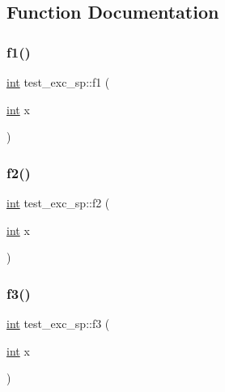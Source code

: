 \subsection{Function Documentation}
\mbox{\label{namespacetest__exc__sp_a6af51689c0be6ab0a45cfe1c9604340d}} 
\subsubsection{\texorpdfstring{f1()}{f1()}}
{\footnotesize\ttfamily \mbox{\hyperlink{warnings_8h_a74f207b5aa4ba51c3a2ad59b219a423b}{int}} test\+\_\+exc\+\_\+sp\+::f1 (\begin{DoxyParamCaption}\item[{\mbox{\hyperlink{warnings_8h_a74f207b5aa4ba51c3a2ad59b219a423b}{int}}}]{x }\end{DoxyParamCaption})\hspace{0.3cm}{\ttfamily [noexcept]}}

\mbox{\label{namespacetest__exc__sp_a9bbbfe12c645b1873720e3d8c8284435}} 
\subsubsection{\texorpdfstring{f2()}{f2()}}
{\footnotesize\ttfamily \mbox{\hyperlink{warnings_8h_a74f207b5aa4ba51c3a2ad59b219a423b}{int}} test\+\_\+exc\+\_\+sp\+::f2 (\begin{DoxyParamCaption}\item[{\mbox{\hyperlink{warnings_8h_a74f207b5aa4ba51c3a2ad59b219a423b}{int}}}]{x }\end{DoxyParamCaption})\hspace{0.3cm}{\ttfamily [noexcept]}}

\mbox{\label{namespacetest__exc__sp_ac8ce741d39a62dff264c82c7e8e2965e}} 
\subsubsection{\texorpdfstring{f3()}{f3()}}
{\footnotesize\ttfamily \mbox{\hyperlink{warnings_8h_a74f207b5aa4ba51c3a2ad59b219a423b}{int}} test\+\_\+exc\+\_\+sp\+::f3 (\begin{DoxyParamCaption}\item[{\mbox{\hyperlink{warnings_8h_a74f207b5aa4ba51c3a2ad59b219a423b}{int}}}]{x }\end{DoxyParamCaption})\hspace{0.3cm}{\ttfamily [noexcept]}}

